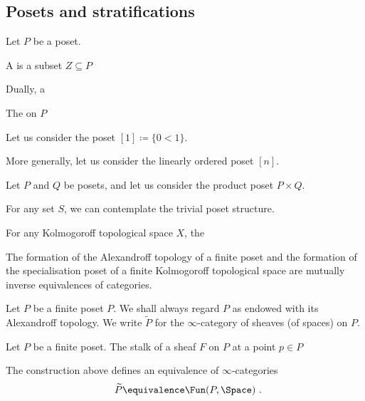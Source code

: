 
\subsection*{Posets and stratifications}

\begin{cnstr}
	Let $ P $ be a poset.

	A  is a subset $ Z \subseteq P $ 
	
	Dually, a  

	The  on $ P $ 
\end{cnstr}

\begin{exm}
	Let us consider the poset $ [ 1 ] \coloneq \{ 0 < 1 \} $.
\end{exm}

\begin{exm}
	More generally, let us consider the linearly ordered poset $ [ n ] $.
\end{exm}

\begin{exm}
	Let $ P $ and $ Q $ be posets, and let us consider the product poset $ P \times Q $.
\end{exm}

\begin{exm}
	For any set $ S $, we can contemplate the trivial poset structure.
\end{exm}

\begin{cnstr}
	For any Kolmogoroff topological space $ X $, the 
\end{cnstr}

\begin{prp}
	The formation of the Alexandroff topology of a finite poset
	and the formation of the specialisation poset of a finite Kolmogoroff topological space
	are mutually inverse equivalences of categories.
\end{prp}

\begin{ntn}
	Let $ P $ be a finite poset $ P $.
	We shall always regard $ P $ as endowed with its Alexandroff topology.
	We write $ \widetilde{P} $ for the $ \infty $-category of sheaves (of spaces) on $ P $.
\end{ntn}

\begin{cnstr}
	Let $ P $ be a finite poset.
	The stalk of a sheaf $ F $ on $ P $ at a point $ p \in P $ 

\end{cnstr}

\begin{prp}
	The construction above defines an equivalence of $ \infty $-categories
	\[
		\widetilde{P} \equivalence \Fun( P, \Space ) \period
	\]
\end{prp}

